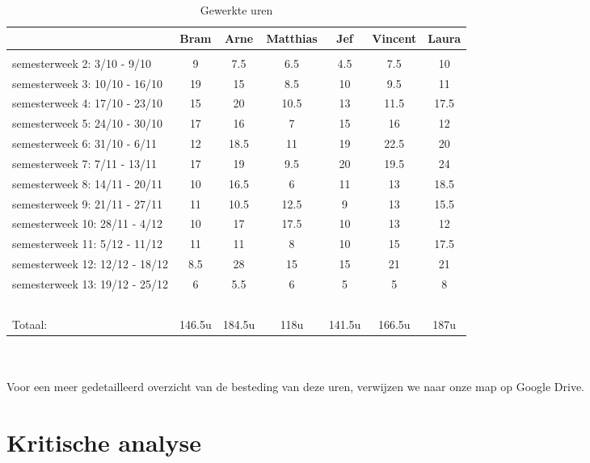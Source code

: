 \documentclass[]{penoverslag}
\begin{document}
\begin{table}[h]
\begin{tabular}{ l c c c c c c }
	& Bram & Arne & Matthias &  Jef & Vincent & Laura\\
	\hline\\
	semesterweek 2: 3/10 - 9/10 & 9 & 7.5 & 6.5 & 4.5 & 7.5 & 10 \\	
	semesterweek 3: 10/10 - 16/10 & 19 & 15 & 8.5 & 10 & 9.5 & 11 \\
	semesterweek 4: 17/10 - 23/10 & 15 & 20 & 10.5 & 13 & 11.5 & 17.5\\
	semesterweek 5: 24/10 - 30/10 & 17 & 16 & 7 & 15 & 16 & 12\\
	semesterweek 6: 31/10 - 6/11 & 12 & 18.5 & 11 & 19 & 22.5 & 20\\
	semesterweek 7: 7/11 - 13/11 & 17 & 19 & 9.5 & 20 & 19.5 & 24\\
	semesterweek 8: 14/11 - 20/11 & 10 & 16.5 & 6 & 11 & 13 & 18.5\\
	semesterweek 9: 21/11 - 27/11 & 11 & 10.5 & 12.5 & 9 & 13 & 15.5\\
	semesterweek 10: 28/11 - 4/12 & 10 & 17 & 17.5 & 10 & 13 & 12\\
	semesterweek 11: 5/12 - 11/12 & 11 & 11 & 8 & 10 & 15 & 17.5\\
	semesterweek 12: 12/12 - 18/12  & 8.5 & 28 & 15 & 15 & 21 & 21\\
	semesterweek 13: 19/12 - 25/12  & 6 & 5.5 & 6 & 5 & 5 & 8\\ 
	~\\
	\hline	
	Totaal: & 146.5u & 184.5u & 118u & 141.5u & 166.5u & 187u
\end{tabular}
\caption{Gewerkte uren}
\label{tabel: gewerkte uren}
\end{table}
\\
\\
Voor een meer gedetailleerd overzicht van de besteding van deze uren, verwijzen we naar onze map op Google Drive.


\section{Kritische analyse}
\end{document}
